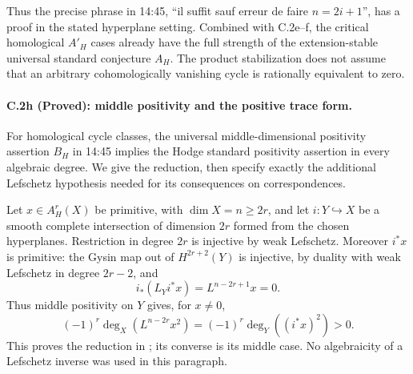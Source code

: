 Thus the precise phrase in 14:45, ``il suffit sauf erreur de faire
$n=2i+1$'', has a proof in the stated hyperplane setting. Combined
with C.2e--f, the critical homological $A'_H$ cases already have the
full strength of the extension-stable universal standard conjecture
$A_H$. The product stabilization does not assume that an arbitrary
cohomologically vanishing cycle is rationally equivalent to zero.

\paragraph{C.2h (Proved): middle positivity and the positive trace form.}
For homological cycle classes, the universal middle-dimensional
positivity assertion $B_H$ in 14:45 implies the Hodge standard
positivity assertion in every algebraic degree. We give the reduction,
then specify exactly the additional Lefschetz hypothesis needed for
its consequences on correspondences.

Let $x\in A_H^r(X)$ be primitive, with $\dim X=n\ge2r$, and let
$i:Y\hookrightarrow X$ be a smooth complete intersection of dimension
$2r$ formed from the chosen hyperplanes. Restriction in degree $2r$
is injective by weak Lefschetz. Moreover $i^*x$ is primitive: the
Gysin map out of $H^{2r+2}(Y)$ is injective, by duality with weak
Lefschetz in degree $2r-2$, and
\[
 i_*(L_Y i^*x)=L^{n-2r+1}x=0.
\]
Thus middle positivity on $Y$ gives, for $x\ne0$,
\[
          (-1)^r\deg_X(L^{n-2r}x^2)
          =(-1)^r\deg_Y((i^*x)^2)>0.
\]
This proves the reduction in
\citet[Proposition 3.7]{cyKleiman1968}; its converse is its middle case.
No algebraicity of a Lefschetz inverse was used in this paragraph.

